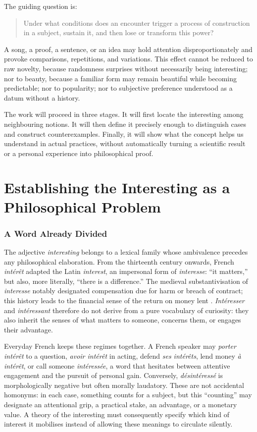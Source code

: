 \documentclass[11pt,a4paper]{article}
\begin{document}
The guiding question is:

\begin{quote}
Under what conditions does an encounter trigger a process of construction in a
subject, sustain it, and then lose or transform this power?
\end{quote}

A song, a proof, a sentence, or an idea may hold attention disproportionately
and provoke comparisons, repetitions, and variations. This effect cannot be
reduced to raw novelty, because randomness surprises without necessarily being
interesting; nor to beauty, because a familiar form may remain beautiful while
becoming predictable; nor to popularity; nor to subjective preference
understood as a datum without a history.

The work will proceed in three stages. It will first locate the interesting
among neighbouring notions. It will then define it precisely enough to
distinguish cases and construct counterexamples. Finally, it will show what the
concept helps us understand in actual practices, without
automatically turning a scientific result or a personal experience into
philosophical proof.

\part{Establishing the Interesting as a Philosophical Problem}

\section{A Word Already Divided}

The adjective \emph{interesting} belongs to a lexical family whose ambivalence
precedes any philosophical elaboration. From the thirteenth century onwards,
French \emph{intérêt} adapted the Latin \emph{interest}, an impersonal form of
\emph{interesse}: ``it matters,'' but also, more literally, ``there is a
difference.'' The medieval substantivisation of \emph{interesse} notably
designated compensation due for harm or breach of contract; this history leads
to the financial sense of the return on money lent
\parencite{academie2026interet,cnrtl2026interet}. \emph{Intéresser} and
\emph{intéressant} therefore do not derive from a pure vocabulary of curiosity:
they also inherit the senses of what matters to someone, concerns them, or
engages their advantage.

Everyday French keeps these regimes together. A French speaker may \emph{porter
intérêt} to a question, \emph{avoir intérêt} in acting, defend \emph{ses
intérêts}, lend money \emph{à intérêt}, or call someone \emph{intéressée}, a
word that hesitates between attentive engagement and the pursuit of personal gain.
Conversely, \emph{désintéressé} is morphologically negative but often morally
laudatory. These are not accidental homonyms: in each case, something counts
for a subject, but this ``counting'' may designate an attentional grip, a
practical stake, an advantage, or a monetary value. A theory of the interesting
must consequently specify which kind of interest it mobilises instead of
allowing these meanings to circulate silently.
\end{document}
